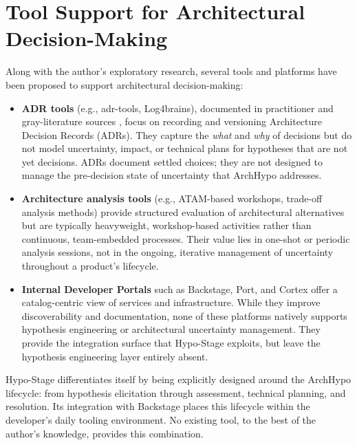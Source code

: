 \section{Tool Support for Architectural Decision-Making}
\label{sec:tool-support}

Along with the author's exploratory research, several tools and platforms have been proposed to support architectural decision-making:

\begin{itemize}
  \item \textbf{ADR tools} (e.g., adr-tools, Log4brains), documented in
  practitioner and gray-literature sources \citep{nygard2011adr, adrtools2024, log4brains2024},
  focus on recording and versioning Architecture Decision Records (ADRs).
  They capture the \emph{what} and
  \emph{why} of decisions but do not model uncertainty, impact, or technical plans for
  hypotheses that are not yet decisions. ADRs document settled choices; they are not
  designed to manage the pre-decision state of uncertainty that ArchHypo addresses.

  \item \textbf{Architecture analysis tools} (e.g., ATAM-based workshops, trade-off
  analysis methods) \citep{kazman1998atam} provide structured evaluation of
  architectural alternatives but are
  typically heavyweight, workshop-based activities rather than continuous,
  team-embedded processes. Their value lies in one-shot or periodic analysis sessions,
  not in the ongoing, iterative management of uncertainty throughout a product's
  lifecycle.

  \item \textbf{Internal Developer Portals} such as Backstage, Port, and Cortex offer
  a catalog-centric view of services and infrastructure. While they improve
  discoverability and documentation, none of these platforms natively supports
  hypothesis engineering or architectural uncertainty management. They provide the
  integration surface that Hypo-Stage exploits, but leave the hypothesis engineering
  layer entirely absent.
\end{itemize}

Hypo-Stage differentiates itself by being explicitly designed around the ArchHypo
lifecycle: from hypothesis elicitation through assessment, technical planning, and
resolution. Its integration with Backstage places this lifecycle within the developer's
daily tooling environment. No existing tool, to the best of the author's knowledge,
provides this combination.

